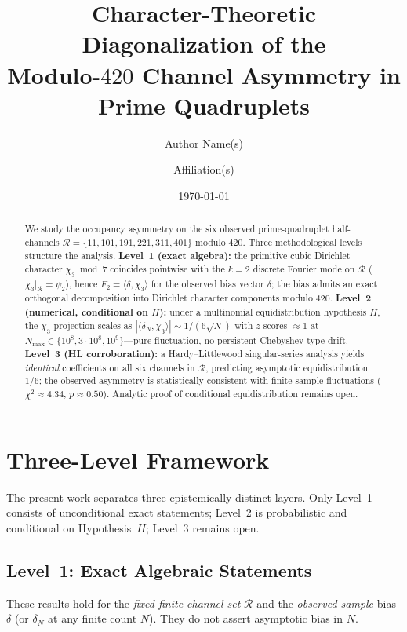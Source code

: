 \documentclass[11pt,a4paper]{article}
\title{Character-Theoretic Diagonalization of the\\
Modulo-$420$ Channel Asymmetry in Prime Quadruplets}
\author{Author Name(s) \and Affiliation(s)}
\date{\today}
\newcommand{\R}{\mathcal{R}}
\begin{document}
\maketitle

\begin{abstract}
We study the occupancy asymmetry on the six observed prime-quadruplet
half-channels $\R=\{11,101,191,221,311,401\}$ modulo $420$.
Three methodological levels structure the analysis.
\textbf{Level~1 (exact algebra):}
the primitive cubic Dirichlet character $\chi_3\bmod 7$ coincides
pointwise with the $k{=}2$ discrete Fourier mode on $\R$
($\chi_3|_{\R}=\psi_2$), hence $F_2=\langle\delta,\chi_3\rangle$ for the
observed bias vector $\delta$; the bias admits an exact orthogonal
decomposition into Dirichlet character components modulo $420$.
\textbf{Level~2 (numerical, conditional on $H$):}
under a multinomial equidistribution hypothesis $H$, the $\chi_3$-projection
scales as $|\langle\delta_N,\chi_3\rangle|\sim 1/(6\sqrt{N})$ with
$z$-scores $\approx 1$ at $N_{\max}\in\{10^8,3\cdot 10^8,10^9\}$---pure
fluctuation, no persistent Chebyshev-type drift.
\textbf{Level~3 (HL corroboration):}
a Hardy--Littlewood singular-series analysis yields \emph{identical}
coefficients on all six channels in $\R$, predicting asymptotic
equidistribution $1/6$; the observed asymmetry is statistically
consistent with finite-sample fluctuations ($\chi^2\approx 4.34$,
$p\approx 0.50$).
Analytic proof of conditional equidistribution remains open.
\end{abstract}

\section{Three-Level Framework}
\label{sec:three-levels}

The present work separates three epistemically distinct layers.
Only Level~1 consists of unconditional exact statements; Level~2 is
probabilistic and conditional on Hypothesis~$H$; Level~3 remains open.

\subsection{Level~1: Exact Algebraic Statements}

These results hold for the \emph{fixed finite channel set} $\R$ and the
\emph{observed sample} bias $\delta$ (or $\delta_N$ at any finite count $N$).
They do not assert asymptotic bias in $N$.
\end{document}
